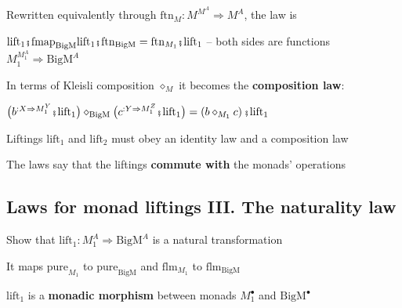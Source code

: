 {\footnotesize{}\vspace{-0.3cm}\hspace{-0.0cm}}Rewritten equivalently
through {\footnotesize{}$\text{ftn}_{M}:M^{M^{A}}\Rightarrow M^{A}$,}
the law is
\begin{center}
{\footnotesize{}\vspace{-0.2cm}\hspace{-0.0cm}$\text{lift}_{1}\bef\text{fmap}_{\text{BigM}}\text{lift}_{1}\bef\text{ftn}_{\text{BigM}}=\text{ftn}_{M_{1}}\bef\text{lift}_{1}$
– both sides are functions $M_{1}^{M_{1}^{A}}\Rightarrow\text{BigM}^{A}$}{\footnotesize\par}
\par\end{center}

{\footnotesize{}\vspace{-0.3cm}\hspace{-0.0cm}}In terms of Kleisli
composition $\diamond_{M}$ it becomes the \textbf{composition law}:
\begin{center}
{\footnotesize{}\vspace{-0.2cm}\hspace{-0.0cm}$\big(b^{:X\Rightarrow M_{1}^{Y}}\bef\text{lift}_{1}\big)\diamond_{\text{BigM}}\big(c^{:Y\Rightarrow M_{1}^{Z}}\bef\text{lift}_{1}\big)=\left(b\diamond_{M_{1}}c\right)\bef\text{lift}_{1}$}{\footnotesize\par}
\par\end{center}

{\footnotesize{}\vspace{-0.3cm}\hspace{-0.0cm}}Liftings $\text{lift}_{1}$
and $\text{lift}_{2}$ must obey an identity law and a composition
law

The laws say that the liftings \textbf{commute with} the monads' operations


\subsection{Laws for monad liftings III. The naturality law}

Show that $\text{lift}_{1}:M_{1}^{A}\Rightarrow\text{BigM}^{A}$ is
a natural transformation 

It maps $\text{pure}_{M_{1}}$ to $\text{pure}_{\text{BigM}}$ and
$\text{flm}_{M_{1}}$ to $\text{flm}_{\text{BigM}}$

$\text{lift}_{1}$ is a \textbf{monadic morphism} between monads $M_{1}^{\bullet}$
and $\text{BigM}^{\bullet}$

